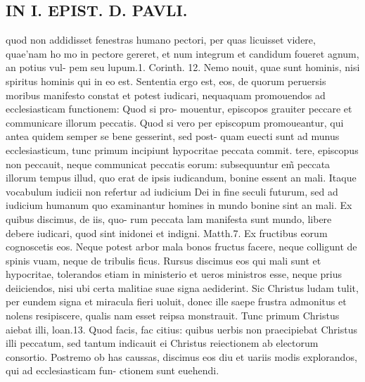 \documentclass{article}
\begin{document}
\begin{pages}
\section*{IN I. EPIST. D. PAVLI. }
\marginpar{[ p.118 ]}\pstart quod non addidisset fenestras humano pectori, per quas licuisset videre, quae’nam ho mo in pectore gereret, et num integrum et candidum foueret agnum, an potius vul- pem seu lupum.1. Corinth. 12. Nemo nouit, quae sunt hominis, nisi spiritus hominis qui in eo est. Sententia ergo est, eos, de quorum peruersis moribus manifesto constat et potest iudicari, nequaquam promouendos ad ecclesiasticam functionem: Quod si pro- mouentur, episcopos grauiter peccare et communicare illorum peccatis. Quod si vero per episcopum promoueantur, qui antea quidem semper se bene gesserint, sed post- quam euecti sunt ad munus ecclesiasticum, tunc primum incipiunt hypocritae peccata commit. tere, episcopus non peccauit, neque communicat peccatis eorum: subsequuntur em̃ peccata illorum tempus illud, quo erat de ipsis iudicandum, bonine essent an mali. Itaque vocabulum iudicii non refertur ad iudicium Dei in fine seculi futurum, sed ad iudicium humanum quo examinantur homines in mundo bonine sint an mali. Ex quibus discimus, de iis, quo- rum peccata lam manifesta sunt mundo, libere debere iudicari, quod sint inidonei et indigni. Matth.7. Ex fructibus eorum cognoscetis eos. Neque potest arbor mala bonos fructus facere, neque colligunt de spinis vuam, neque de tribulis ficus. Rursus discimus eos qui mali sunt et hypocritae, tolerandos etiam in ministerio et ueros ministros esse, neque prius deiiciendos, nisi ubi certa malitiae suae signa aediderint. Sic Christus ludam tulit, per eundem signa et miracula fieri uoluit, donec ille saepe frustra admonitus et nolens resipiscere, qualis nam esset reipsa monstrauit. Tunc primum Christus aiebat illi, loan.13. Quod facis, fac citius: quibus uerbis non praecipiebat Christus illi peccatum, sed tantum indicauit ei Christus reiectionem ab electorum consortio. Postremo ob has caussas, discimus eos diu et uariis modis explorandos, qui ad ecclesiasticam fun- ctionem sunt euehendi.  \pend
{}
{}

\end{pages}
\end{document}
